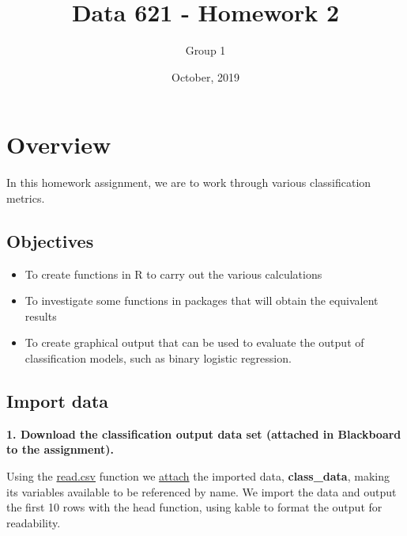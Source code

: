 \documentclass[]{article}
\title{Data 621 - Homework 2}
\author{Group 1}
\date{October, 2019}
\providecommand{\tightlist}{%
  \setlength{\itemsep}{0pt}\setlength{\parskip}{0pt}}
\begin{document}
\maketitle

{
\setcounter{tocdepth}{2}
\tableofcontents
}
\hypertarget{overview}{%
\section{Overview}\label{overview}}

In this homework assignment, we are to work through various
classification metrics.

\hypertarget{objectives}{%
\subsection{Objectives}\label{objectives}}

\begin{itemize}
\tightlist
\item
  To create functions in R to carry out the various calculations
\item
  To investigate some functions in packages that will obtain the
  equivalent results
\item
  To create graphical output that can be used to evaluate the output of
  classification models, such as binary logistic regression.
\end{itemize}

\hypertarget{import-data}{%
\subsection{Import data}\label{import-data}}

\textbf{1. Download the classification output data set (attached in
Blackboard to the assignment).}

Using the \href{https://www.rdocumentation.org/packages/csv}{read.csv}
function we
\href{https://www.rdocumentation.org/packages/base/versions/3.6.1/topics/attach}{attach}
the imported data, \textbf{class\_data}, making its variables available
to be referenced by name. We import the data and output the first 10
rows with the head function, using kable to format the output for
readability.
\end{document}
